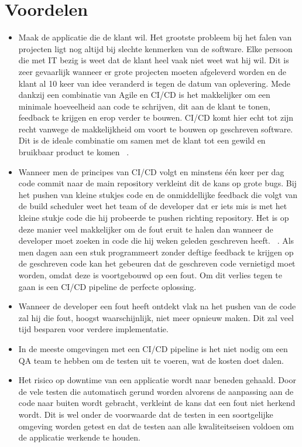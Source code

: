 \section{Voordelen}
\begin{itemize}
    \item Maak de applicatie die de klant wil. Het grootste probleem bij het falen van projecten ligt nog altijd bij slechte kenmerken van de software. Elke persoon die met IT bezig is weet dat de klant heel vaak niet weet wat hij wil. Dit is zeer gevaarlijk wanneer er grote projecten moeten afgeleverd worden en de klant al 10 keer van idee veranderd is tegen de datum van oplevering. Mede dankzij een combinatie van Agile en CI/CD is het makkelijker om een minimale hoeveelheid aan code te schrijven, dit aan de klant te tonen, feedback te krijgen en erop verder te bouwen. CI/CD komt hier echt tot zijn recht vanwege de makkelijkheid om voort te bouwen op geschreven software. Dit is de ideale combinatie om samen met de klant tot een gewild en bruikbaar product te komen ~\autocite{Humble2012}.
    \item Wanneer men de principes van CI/CD volgt en minstens één keer per dag code commit naar de main repository verkleint dit de kans op grote bugs. Bij het pushen van kleine stukjes code en de onmiddellijke feedback die volgt van de build scheduler weet het team of de developer dat er iets mis is met het kleine stukje code die hij probeerde te pushen richting repository. Het is op deze manier veel makkelijker om de fout eruit te halen dan wanneer de developer moet zoeken in code die hij weken geleden geschreven heeft. ~\autocite{Fowler2006}.
    Als men dagen aan een stuk programmeert zonder deftige feedback te krijgen op de geschreven code kan het gebeuren dat de geschreven code vernietigd moet worden, omdat deze is voortgebouwd op een fout. Om dit verlies tegen te gaan is een CI/CD pipeline de perfecte oplossing.
    \item Wanneer de developer een fout heeft ontdekt vlak na het pushen van de code zal hij die fout, hoogst waarschijnlijk, niet meer opnieuw maken. Dit zal veel tijd besparen voor verdere implementatie.
    \item In de meeste omgevingen met een CI/CD pipeline is het niet nodig om een QA team te hebben om de testen uit te voeren, wat de kosten doet dalen.
    \item Het risico op downtime van een applicatie wordt naar beneden gehaald. Door de vele testen die automatisch gerund worden alvorens de aanpassing aan de code naar buiten wordt gebracht, verkleint de kans dat een fout niet herkend wordt. Dit is wel onder de voorwaarde dat de testen in een soortgelijke omgeving worden getest en dat de testen aan alle kwaliteitseisen voldoen om de applicatie werkende te houden.

\end{itemize}
